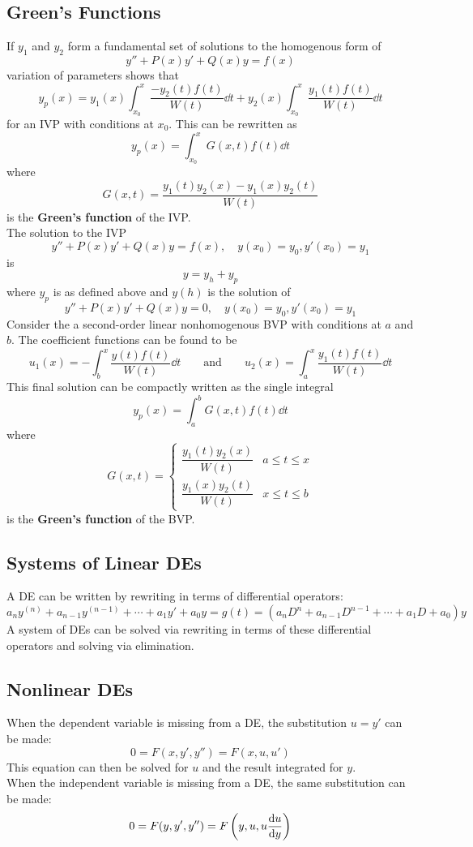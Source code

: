 \documentclass[12pt, A4]{article}
\begin{document}
		\subsection{Green's Functions}
			If \(y_1\) and \(y_2\) form a fundamental set of solutions to the homogenous form of
				\[y'' + P(x)y' + Q(x)y = f(x)\]
				variation of parameters shows that
				\[y_p(x) = y_1(x)\int_{x_0}^x \frac{-y_2(t)f(t)}{W(t)}\dd{t} + y_2(x)\int_{x_0}^x \frac{y_1(t)f(t)}{W(t)}\dd{t}\]
				for an IVP with conditions at \(x_0\). This can be rewritten as
				\[\boxed{y_p(x) = \int_{x_0}^x G(x, t)f(t)\dd{t}}\]
				where
				\[\boxed{G(x, t) = \frac{y_1(t)y_2(x) - y_1(x)y_2(t)}{W(t)}}\]
				is the \textbf{Green's function} of the IVP. \\
				The solution to the IVP
					\[y'' + P(x)y' + Q(x)y = f(x), \quad y(x_0) = y_0, y'(x_0) = y_1\]
					is
					\[y = y_h + y_p\]
					where \(y_p\) is as defined above and \(y(h)\) is the solution of
					\[y'' + P(x)y' + Q(x)y = 0, \quad y(x_0) = y_0, y'(x_0) = y_1\]
			Consider the a second-order linear nonhomogenous BVP with conditions at \(a\) and \(b\). The coefficient functions can be found to be
				\[
					u_1(x) = -\int_b^x\frac{y(t)f(t)}{W(t)}\dd{t} \qquad \text{and} \qquad
					u_2(x) = \int_a^x\frac{y_1(t)f(t)}{W(t)}\dd{t}
				\]
				This final solution can be compactly written as the single integral
				\[\boxed{y_p(x) = \int_a^b G(x, t)f(t) \dd{t}}\]
				where
				\[\boxed{
					G(x, t) = \begin{cases}
						\dfrac{y_1(t)y_2(x)}{W(t)} & a \le t \le x \\
						\dfrac{y_1(x)y_2(t)}{W(t)} & x \le t \le b
					\end{cases}
				}\]
				is the \textbf{Green's function} of the BVP.
		\subsection{Systems of Linear DEs}
			A DE can be written by rewriting in terms of differential operators:
				\[
					a_ny^{(n)} + a_{n - 1}y^{(n - 1)} + \cdots + a_1y' + a_0y = g(t)
						= \left(a_nD^n + a_{n - 1}D^{n - 1} + \cdots + a_1D + a_0\right)y 
				\]
				A system of DEs can be solved via rewriting in terms of these differential operators and solving via elimination.
		\subsection{Nonlinear DEs}
			When the dependent variable is missing from a DE, the substitution \(u = y'\) can be made:
				\[
					0 = F(x, y', y'') 
						= F(x, u, u')
				\]
				This equation can then be solved for \(u\) and the result integrated for \(y\). \\
			When the independent variable is missing from a DE, the same substitution can be made:
				\[
					0 = F(y, y', y'')
						= F\left(y, u, u\dv{u}{y}\right)
				\]
\end{document}
